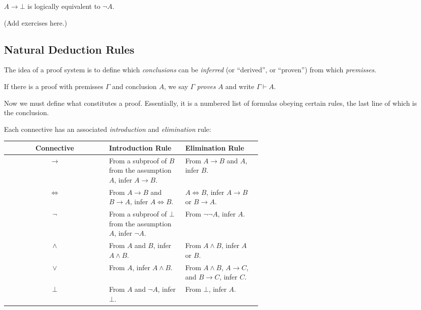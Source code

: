 \documentclass{article}
\begin{document}
\begin{proposition}
    $A \to \bot$ is logically equivalent to $\neg A$.
\end{proposition}

(Add exercises here.)

\pagebreak

\subsection*{Natural Deduction Rules}

The idea of a proof system is to define which \textit{conclusions} can be \textit{inferred} (or ``derived'', or ``proven'') from which \textit{premisses}.

\begin{definition}
    If there is a proof with premisses $\Gamma$ and conclusion $A$, we say $\Gamma$ \textit{proves} $A$ and write $\Gamma \vdash A$. 
\end{definition}

Now we must define what constitutes a proof. Essentially, it is a numbered list of formulas obeying certain rules, the last line of which is the conclusion.

Each connective has an associated \textit{introduction} and \textit{elimination} rule:

\begin{center}
\begin{tabular}{| c | p{0.3\linewidth} | p{0.3\linewidth} |}
    \hline
    \textbf{Connective} & \textbf{Introduction Rule} & \textbf{Elimination Rule} \\ \hline
    $\to$ & From a subproof of $B$ from the assumption $A$, infer $A \to B$. & From $A \to B$ and $A$, infer $B$. \\ \hline
    $\iff$ & From $A \to B$ and $B \to A$, infer $A \iff B$. & $A \iff B$, infer $A \to B$ or $B \to A$. \\ \hline
    $\neg$ & From a subproof of $\bot$ from the assumption $A$, infer
    $\neg A$. & From $\neg \neg A$, infer $A$. \\ \hline
    $\wedge$ & From $A$ and $B$, infer $A \wedge B$. &  From $A \wedge B$, infer $A$ or $B$. \\ \hline
    $\vee$ & From $A$, infer $A \wedge B$. & From $A \wedge B$, $A \to C$, and $B \to C$, infer $C$. \\ \hline
    $\bot$ & From $A$ and $\neg A$, infer $\bot$. & From $\bot$, infer $A$. \\ \hline
\end{tabular}
\end{center}
\end{document}
